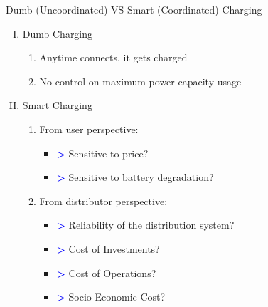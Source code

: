 \documentclass[aspectratio=169]{beamer}
\begin{document}

\begin{frame}{\small Dumb (Uncoordinated) VS Smart (Coordinated) Charging}
\begin{enumerate}[I.]
\item<1-> Dumb Charging
\begin{enumerate}
\item<2-> Anytime connects, it gets charged
\item<3-> No control on maximum power capacity usage
\end{enumerate}
\item<4-> Smart Charging
\begin{enumerate}
\item<5-> From user perspective:
\begin{itemize}
\item<6-> \textcolor{blue}{\textbf{>}} Sensitive to price? 
        
\item<7->  {\textcolor{blue}{\textbf{>}} Sensitive to battery degradation?}
\end{itemize}
\item<8->  {From distributor perspective:}
\begin{itemize}
\item<9->  {\textcolor{blue}{\textbf{>}} Reliability of the distribution system?}
\item<10->  {\textcolor{blue}{\textbf{>}} Cost of Investments?}
\item<11->  {\textcolor{blue}{\textbf{>}} Cost of Operations?}
\item<12->  {\textcolor{blue}{\textbf{>}} Socio-Economic Cost?}
\end{itemize}
\end{enumerate}
\end{enumerate}
\end{frame}
\end{document}
